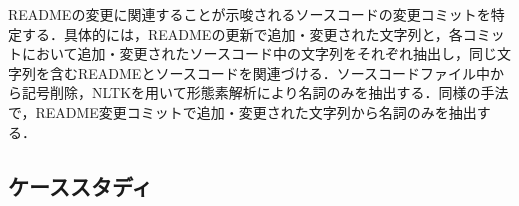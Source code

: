 \documentclass[uplatex,dvipdfmx,a4paper,twocolumn,base=11pt,jbase=11pt,ja=standard]{bxjsarticle}  %
\newcommand{\todo}[1]{\colorbox{yellow}{{\bf TODO}:}{\color{red} {\textbf{[#1]}}}}
\begin{document}






READMEの変更に関連することが示唆されるソースコードの変更コミットを特定する．具体的には，READMEの更新で追加・変更された文字列と，各コミットにおいて追加・変更されたソースコード中の文字列をそれぞれ抽出し，同じ文字列を含むREADMEとソースコードを関連づける．ソースコードファイル中から記号削除，NLTKを用いて形態素解析により名詞のみを抽出する．同様の手法で，README変更コミットで追加・変更された文字列から名詞のみを抽出する．


%
%




\subsection{ケーススタディ}
\end{document}

